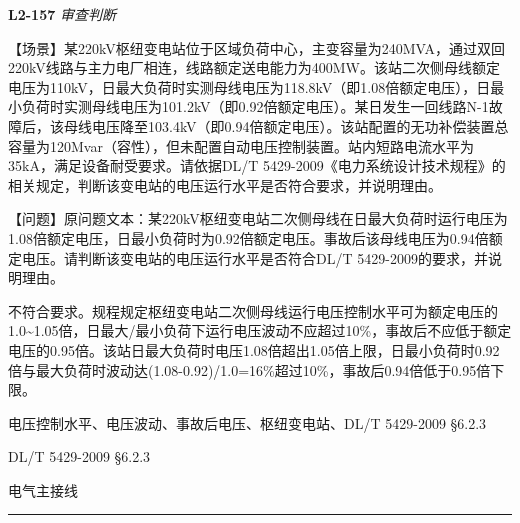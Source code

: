 \documentclass[12pt,a4paper]{ctexart}
\begin{document}
\noindent\textbf{L2-157} \hfill \textit{审查判断}
\begin{description}[leftmargin=1.5em,style=nextline,font=\normalfont]
  \item[Q:] 【场景】某220kV枢纽变电站位于区域负荷中心，主变容量为240MVA，通过双回220kV线路与主力电厂相连，线路额定送电能力为400MW。该站二次侧母线额定电压为110kV，日最大负荷时实测母线电压为118.8kV（即1.08倍额定电压），日最小负荷时实测母线电压为101.2kV（即0.92倍额定电压）。某日发生一回线路N-1故障后，该母线电压降至103.4kV（即0.94倍额定电压）。该站配置的无功补偿装置总容量为120Mvar（容性），但未配置自动电压控制装置。站内短路电流水平为35kA，满足设备耐受要求。请依据DL/T 5429-2009《电力系统设计技术规程》的相关规定，判断该变电站的电压运行水平是否符合要求，并说明理由。

【问题】原问题文本：某220kV枢纽变电站二次侧母线在日最大负荷时运行电压为1.08倍额定电压，日最小负荷时为0.92倍额定电压。事故后该母线电压为0.94倍额定电压。请判断该变电站的电压运行水平是否符合DL/T 5429-2009的要求，并说明理由。
  \item[A:] 不符合要求。规程规定枢纽变电站二次侧母线运行电压控制水平可为额定电压的1.0\textasciitilde{}1.05倍，日最大/最小负荷下运行电压波动不应超过10\%，事故后不应低于额定电压的0.95倍。该站日最大负荷时电压1.08倍超出1.05倍上限，日最小负荷时0.92倍与最大负荷时波动达(1.08-0.92)/1.0=16\%超过10\%，事故后0.94倍低于0.95倍下限。
  \item[KW:] 电压控制水平、电压波动、事故后电压、枢纽变电站、DL/T 5429-2009 §6.2.3
  \item[Std:] DL/T 5429-2009 §6.2.3
  \item[Topic:] 电气主接线
\end{description}
\vspace{4pt}
\hrule\vspace{6pt}
\end{document}
